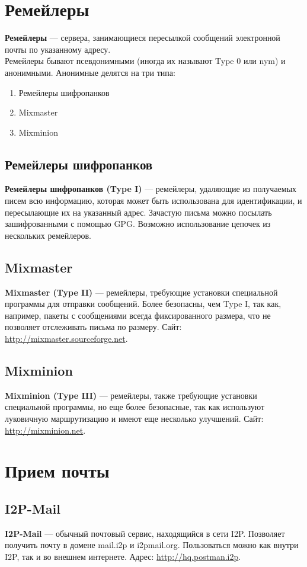 \section{Ремейлеры}
\textbf{Ремейлеры} --- сервера, занимающиеся пересылкой сообщений электронной почты по указанному адресу.\\
Ремейлеры бывают псевдонимными (иногда их называют Type 0 или nym) и анонимными. Анонимные делятся на три типа:
\begin{enumerate}
\item Ремейлеры шифропанков
\item Mixmaster 
\item Mixminion
\end{enumerate}
\subsection{Ремейлеры шифропанков}
\textbf{Ремейлеры шифропанков (Type I)} --- ремейлеры, удаляющие из получаемых писем всю информацию, которая может быть использована для идентификации, и пересылающие их на указанный адрес. Зачастую письма можно посылать зашифрованными с помощью GPG. Возможно использование цепочек из нескольких ремейлеров.
\subsection{Mixmaster}
\textbf{Mixmaster (Type II)} --- ремейлеры, требующие установки специальной программы для отправки сообщений. Более безопасны, чем Type I, так как, например, пакеты с сообщениями всегда фиксированного размера, что не позволяет отслеживать письма по размеру. Сайт: \url{http://mixmaster.sourceforge.net}.
\subsection{Mixminion}
\textbf{Mixminion (Type III)} --- ремейлеры, также требующие установки специальной программы, но еще более безопасные, так как используют луковичную маршрутизацию и имеют еще несколько улучшений. Сайт: \url{http://mixminion.net}.

\section{Прием почты}
\subsection{I2P-Mail}
\textbf{I2P-Mail} --- обычный почтовый сервис, находящийся в сети I2P. Позволяет получить почту в домене mail.i2p и i2pmail.org. Пользоваться можно как внутри I2P, так и во внешнем интернете. Адрес: \url{http://hq.postman.i2p}.
